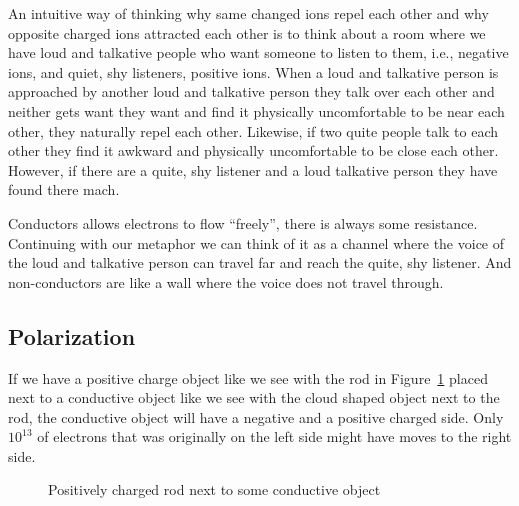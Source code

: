 An intuitive way of thinking why same changed ions repel each other and why opposite charged ions attracted each other is to think about a room where we have loud and talkative people who want someone to listen to them, i.e., negative ions, and quiet, shy listeners, positive ions. When a loud and talkative person is approached by another loud and talkative person they talk over each other and neither gets want they want and find it physically uncomfortable to be near each other, they naturally repel each other. Likewise, if two quite people talk to each other they find it awkward and physically uncomfortable to be close each other. However, if there are a quite, shy listener and a loud talkative person they have found there mach.

Conductors allows electrons to flow ``freely'', there is always some resistance. Continuing with our metaphor we can think of it as a channel where the voice of the loud and talkative person can travel far and reach the quite, shy listener. And non-conductors are like a wall where the voice does not travel through.

\subsection{Polarization}

If we have a positive charge object like we see with the rod in Figure~\ref{fig:charged-rod} placed next to a conductive object like we see with the cloud shaped object next to the rod, the conductive object will have a negative and a positive charged side. Only $10^{13}$ of electrons that was originally on the left side might have moves to the right side.

\begin{figure}[H]
\centering
{}
  \caption{Positively charged rod next to some conductive object}
  \label{fig:charged-rod}
\end{figure}

